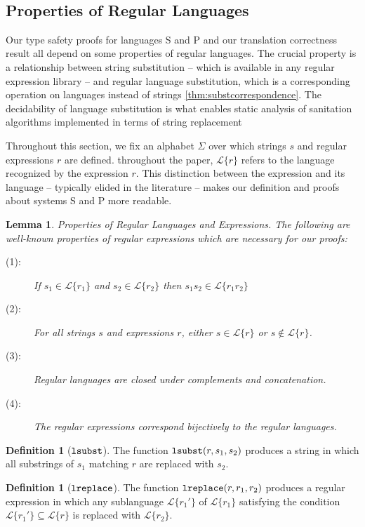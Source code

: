 \documentclass{acm_proc_article-sp}
\newtheorem{lem}[thm]{Lemma}
\theoremstyle{definition}
\newtheorem{defn}[thm]{Definition}
\newcommand{\Lagr}{\mathcal{L}}
\newcommand{\lang}[1]{\Lagr\{#1\}}
\newcommand{\lsubst}[3]{{\tt lsubst}(#1,#2,#3)} %
\newcommand{\lreplace}[3]{{\tt lreplace}(#1, #2, #3)}
\begin{document}
\newpage
\ 
\newpage
\ 
\newpage

\subsection{Properties of Regular Languages}

Our type safety proofs for languages S and P and our translation correctness
result all depend on some properties of regular languages. The crucial property
is a relationship between string substitution -- which is available in any regular
expression library -- and regular language substitution, which is a corresponding operation
on languages instead of strings \ref{thm:substcorrespondence}.
The decidability of language substitution is what enables static analysis of 
sanitation algorithms implemented in terms of string replacement

Throughout this section, we fix an alphabet $\Sigma$ over which strings $s$ and
regular expressions $r$ are defined. throughout the paper, $\lang{r}$ refers to the
language recognized by the expression $r$. This distinction between the expression
and its language -- typically elided in the literature -- makes our definition and
proofs about systems S and P more readable.

\begin{lem}{Properties of Regular Languages and Expressions.} \label{thm:regexprops}
The following are well-known properties of regular expressions which are necessary for our proofs:
\begin{description}
\item[(1):] If $s_1 \in \lang{r_1}$ and $s_2 \in \lang{r_2}$ then $s_1s_2 \in \lang{r_1r_2}$
\item[(2):] For all strings $s$ and expressions $r$, either $s \in \lang{r}$ or $s \not \in \lang{r}$.
\item[(3):] Regular languages are closed under complements and concatenation.
\item[(4):] The regular expressions correspond bijectively to the regular languages.
\end{description}
\end{lem}

\begin{defn}[$\tt{lsubst}$]
The function $\lsubst{r}{s_1}{s_2}$ produces a string in which all substrings of $s_1$ matching $r$ are replaced with $s_2$.
\end{defn}

\begin{defn}[$\tt{lreplace}$]
The function $\lreplace{r}{r_1}{r_2}$ produces a regular expression in which any sublanguage $\lang{r_1'}$ of $\lang{r_1}$ satisfying the condition $\lang{r_1'} \subseteq{\lang{r}}$ is replaced with $\lang{r_2}$.
\end{defn}
\end{document}
